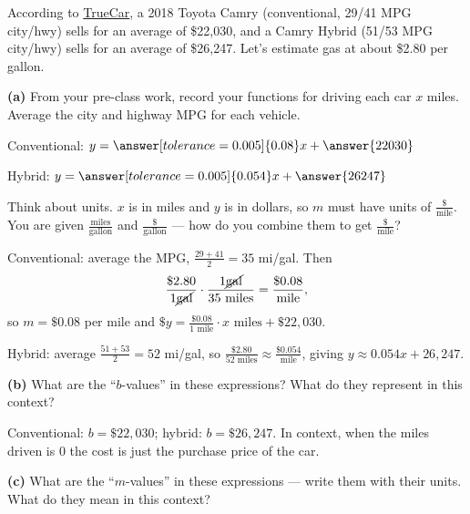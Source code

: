\documentclass[12pt]{ximera}
\begin{document}
\begin{problem}
According to \href{http://www.truecar.com}{TrueCar}, a 2018 Toyota Camry
(conventional, 29/41 MPG city/hwy) sells for an average of \$22,030, and a Camry
Hybrid (51/53 MPG city/hwy) sells for an average of \$26,247. Let's estimate gas at
about \$2.80 per gallon.

\begin{prompt}
\textbf{(a)} From your pre-class work, record your functions for driving each car $x$
miles. Average the city and highway MPG for each vehicle.

Conventional: $y = \answer[tolerance=0.005]{0.08} x + \answer{22030}$

Hybrid: $y = \answer[tolerance=0.005]{0.054} x + \answer{26247}$

\begin{hint}
Think about units. $x$ is in miles and $y$ is in dollars, so $m$ must have units of
$\frac{\$}{\text{mile}}$. You are given $\frac{\text{miles}}{\text{gallon}}$ and
$\frac{\$}{\text{gallon}}$ --- how do you combine them to get $\frac{\$}{\text{mile}}$?
\end{hint}

\begin{solution}
Conventional: average the MPG, $\frac{29 + 41}{2} = 35$ mi/gal. Then
\[
\frac{\$2.80}{1 \cancel{\text{gal}}} \cdot \frac{1 \cancel{\text{gal}}}{35 \text{ miles}}
= \frac{\$0.08}{\text{mile}},
\]
so $m = \$0.08$ per mile and
$\$y = \frac{\$0.08}{1 \text{ mile}} \cdot x \text{ miles} + \$22{,}030$.

Hybrid: average $\frac{51 + 53}{2} = 52$ mi/gal, so
$\frac{\$2.80}{52 \text{ miles}} \approx \frac{\$0.054}{\text{mile}}$, giving
$y \approx 0.054x + 26{,}247$.
\end{solution}
\end{prompt}

\begin{prompt}
\textbf{(b)} What are the ``$b$-values'' in these expressions? What do they represent
in this context?
\begin{freeResponse}
\end{freeResponse}

\begin{solution}
Conventional: $b = \$22{,}030$; hybrid: $b = \$26{,}247$. In context, when the miles
driven is $0$ the cost is just the purchase price of the car.
\end{solution}
\end{prompt}

\begin{prompt}
\textbf{(c)} What are the ``$m$-values'' in these expressions --- write them with
their units. What do they mean in this context?
\begin{freeResponse}
\end{freeResponse}


\end{prompt}
\end{problem}
\end{document}
